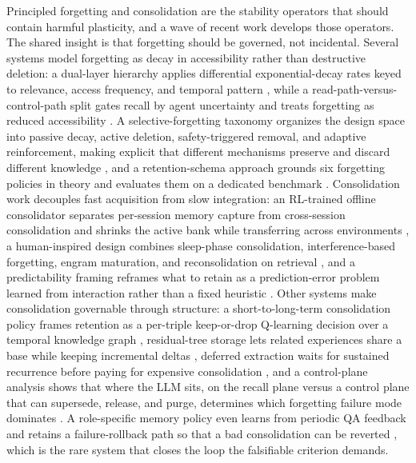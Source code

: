 Principled forgetting and consolidation are the stability operators that should contain harmful plasticity, and a wave of recent work develops those operators. The shared insight is that forgetting should be governed, not incidental. Several systems model forgetting as decay in accessibility rather than destructive deletion: a dual-layer hierarchy applies differential exponential-decay rates keyed to relevance, access frequency, and temporal pattern \citep{wei2026fademem}, while a read-path-versus-control-path split gates recall by agent uncertainty and treats forgetting as reduced accessibility \citep{rana2026oblivion}. A selective-forgetting taxonomy organizes the design space into passive decay, active deletion, safety-triggered removal, and adaptive reinforcement, making explicit that different mechanisms preserve and discard different knowledge \citep{gu2026fsfm}, and a retention-schema approach grounds six forgetting policies in theory and evaluates them on a dedicated benchmark \citep{alqithami2025mars}. Consolidation work decouples fast acquisition from slow integration: an RL-trained offline consolidator separates per-session memory capture from cross-session consolidation and shrinks the active bank while transferring across environments \citep{ye2026autodreamer}, a human-inspired design combines sleep-phase consolidation, interference-based forgetting, engram maturation, and reconsolidation on retrieval \citep{kerestecioglu2026humaninspiredmemory}, and a predictability framing reframes what to retain as a prediction-error problem learned from interaction rather than a fixed heuristic \citep{ma2026nemori}. Other systems make consolidation governable through structure: a short-to-long-term consolidation policy frames retention as a per-triple keep-or-drop Q-learning decision over a temporal knowledge graph \citep{kim2026stltransfer}, residual-tree storage lets related experiences share a base while keeping incremental deltas \citep{tan2026deltamem}, deferred extraction waits for sustained recurrence before paying for expensive consolidation \citep{dai2026recmem}, and a control-plane analysis shows that where the LLM sits, on the recall plane versus a control plane that can supersede, release, and purge, determines which forgetting failure mode dominates \citep{yang2026controlplaneforgetting}. A role-specific memory policy even learns from periodic QA feedback and retains a failure-rollback path so that a bad consolidation can be reverted \citep{chen2026adamem}, which is the rare system that closes the loop the falsifiable criterion demands.

